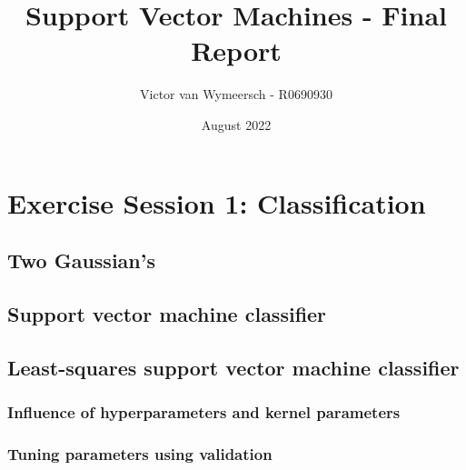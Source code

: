 \documentclass{article}
\title{Support Vector Machines - Final Report}
\author{Victor van Wymeersch - R0690930}
\date{August 2022}
\begin{document}
\maketitle
\newpage

    
    
    
\section{Exercise Session 1: Classification}
    \subsection{Two Gaussian's} 
    
    \subsection{Support vector machine classifier}
    
    \subsection{Least-squares support vector machine classifier}
    
        \subsubsection{Influence of hyperparameters and kernel parameters}
        
        \subsubsection{Tuning parameters using validation}
        
\end{document}
